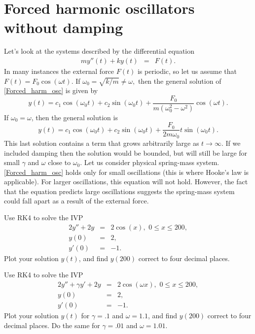 \section*{Forced harmonic oscillators without damping}
Let's look at the systems described by the differential equation
\begin{eqnarray}
my''(t)  + ky(t) &=& F(t). \label{Forced_harm_osc}
\end{eqnarray}
In many instances the external force $F(t)$ is periodic, so let us assume that $F(t) = F_0 \cos(\omega t)$. If $\omega_0 = \sqrt{k/m} \not = \omega,$ then the  general solution of \ref{Forced_harm_osc} is given by 
\[y(t) = c_1 \cos (\omega_0 t) + c_2\sin (\omega_0 t) + \frac{F_0}{m(\omega_0^2 - \omega^2)} \cos (\omega t).\]
If $\omega_0 = \omega$, then the general solution is 
\[y(t) = c_1 \cos (\omega_0 t) + c_2\sin (\omega_0 t) + \frac{F_0}{2m\omega_0} t \sin (\omega_0 t).\]
This last solution contains a term that grows arbitrarily large as $t \to \infty$. If we included damping then the solution would be bounded, but will still be large for small $\gamma$ and $\omega$ close to $\omega_0$. Let us consider physical spring-mass system. \ref{Forced_harm_osc} holds only for small oscillations (this is where Hooke's law is applicable). For larger oscillations, this equation will not hold. However, the fact that the equation predicts large oscillations suggests the spring-mass system could fall apart as a result of the external force.

\begin{problem}
Use RK4 to solve the IVP
\begin{eqnarray*}
2y'' + 2y &=& 2 \cos (x), \,\, 0 \leq x \leq 200,\\
y(0) &=& 2, \\
y'(0) &=& -1.
\end{eqnarray*} 
Plot your solution $y(t)$, and find $y(200)$ correct to four decimal places. 
\end{problem}

\begin{problem}
Use RK4 to solve the IVP
\begin{eqnarray*}
2y'' + \gamma y' + 2y &=& 2 \cos (\omega x), \,\, 0 \leq x \leq 200,\\
y(0) &=& 2, \\
y'(0) &=& -1.
\end{eqnarray*} 
Plot your solution $y(t)$ for $\gamma = .1$ and $\omega =1.1$, and find $y(200)$ correct to four decimal places. 
Do the same for  $\gamma = .01$ and $\omega =1.01$.
\end{problem}

%
%
%
